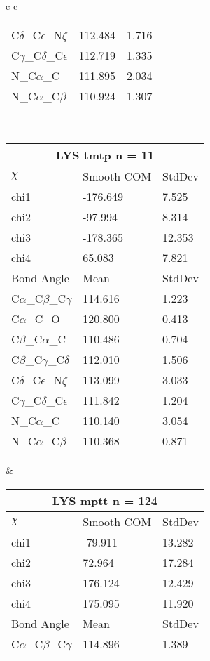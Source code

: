 \begin{longtable}{ c c }
\begin{tabular}{ l l l }
  C$\delta$\_C$\epsilon$\_N$\zeta$ & 112.484 & 1.716\\
  C$\gamma$\_C$\delta$\_C$\epsilon$ & 112.719 & 1.335\\
  N\_C$\alpha$\_C & 111.895 & 2.034\\
  N\_C$\alpha$\_C$\beta$ & 110.924 & 1.307\\
  \bottomrule
  \end{tabular}
  \\
  \begin{tabular}{ l l l }
  \toprule
  \multicolumn{3}{c}{LYS \textbf{tmtp} n = 11} \\ \toprule
  $\chi$       & Smooth COM & StdDev \\ \midrule
  chi1 & -176.649 & 7.525 \\ 
  chi2 & -97.994 & 8.314 \\ 
  chi3 & -178.365 & 12.353 \\ 
  chi4 & 65.083 & 7.821 \\ \midrule
  Bond Angle   & Mean     & StdDev \\ \midrule
  C$\alpha$\_C$\beta$\_C$\gamma$ & 114.616 & 1.223\\
  C$\alpha$\_C\_O & 120.800 & 0.413\\
  C$\beta$\_C$\alpha$\_C & 110.486 & 0.704\\
  C$\beta$\_C$\gamma$\_C$\delta$ & 112.010 & 1.506\\
  C$\delta$\_C$\epsilon$\_N$\zeta$ & 113.099 & 3.033\\
  C$\gamma$\_C$\delta$\_C$\epsilon$ & 111.842 & 1.204\\
  N\_C$\alpha$\_C & 110.140 & 3.054\\
  N\_C$\alpha$\_C$\beta$ & 110.368 & 0.871\\
  \bottomrule
  \end{tabular}
  &
  \begin{tabular}{ l l l }
  \toprule
  \multicolumn{3}{c}{LYS \textbf{mptt} n = 124} \\ \toprule
  $\chi$       & Smooth COM & StdDev \\ \midrule
  chi1 & -79.911 & 13.282 \\ 
  chi2 & 72.964 & 17.284 \\ 
  chi3 & 176.124 & 12.429 \\ 
  chi4 & 175.095 & 11.920 \\ \midrule
  Bond Angle   & Mean     & StdDev \\ \midrule
  C$\alpha$\_C$\beta$\_C$\gamma$ & 114.896 & 1.389\\

\end{tabular}
\end{longtable}
